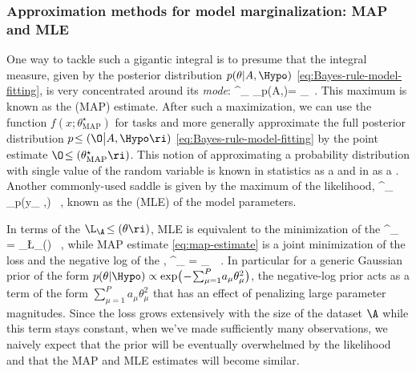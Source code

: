 \subsubsection{Approximation methods for model marginalization: MAP and MLE}

One way to tackle such a gigantic integral is to presume that the integral measure, given by the posterior distribution $p(\theta \vert A,\Hypo)$ \eqref{eq:Bayes-rule-model-fitting}, is very concentrated around its \emph{mode}:
\be\label{eq:map-estimate}
\theta^\star_{} \equiv \argmax_\theta p(\theta \vert A,\Hypo)= \argmax_\theta {} \, .
\ee
This maximum is known as the  (MAP) estimate.
After such a maximization, we can use the function $f(x;\theta^\star_{\text{MAP}})$ for tasks and more generally approximate the full posterior distribution $p\!\le(\O \big|A, \Hypo \ri)$  \eqref{eq:Bayes-rule-model-fitting} by the point estimate $\O\!\le(\theta^\star_{\text{MAP}}\ri)$.
This notion of approximating a probability distribution with single value of the random variable is known in statistics as a  and in  as a .
Another commonly-used saddle is given by the maximum of the likelihood,
\be\label{eq:mle-estimate}
\theta^\star_{} \equiv \argmax_\theta p(y_{\A} \vert \theta,\Hypo)  \, ,
\ee
known as the   (MLE) of the model parameters.

In terms of the   $\L_{\A}\!\le(\theta\ri)$,
MLE is equivalent to the minimization of the 
\be\label{eq:mle-estimate-loss}
\theta^\star_{} = \argmin_\theta  \L_{\A}\!\le(\theta\ri) \, ,
\ee
while MAP  estimate \eqref{eq:map-estimate} is a joint minimization of the loss and the negative log of the ,
\be\label{eq:map-estimate-loss}
\theta^\star_{} = \argmin_\theta \, \, .
\ee
In particular for a generic Gaussian prior of the form $p(\theta\vert\Hypo)\propto\exp\!\big(\!-\!\sum_{\mu=1}^P\! a_{\mu}\theta_\mu^2\big)$, the negative-log prior acts as a  term of the form $\sum_{\mu=1}^P a_{\mu}\theta_\mu^2$ that has an effect of penalizing large parameter magnitudes.
Since the loss grows extensively with the size of the dataset $\A$ while this  term stays constant, when we've made sufficiently many observations, we naively expect that the prior will be eventually overwhelmed by the likelihood and that the MAP and MLE estimates will become similar.


